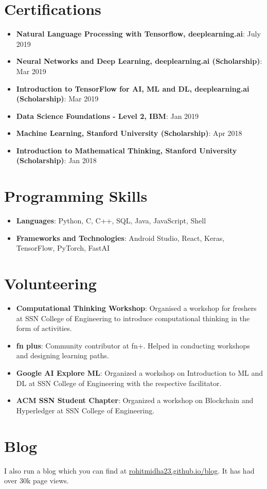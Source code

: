\documentclass[letterpaper,11pt]{article}
\newcommand{\resumeItem}[2]{
  \item\small{
    \textbf{#1}{: #2 \vspace{-2pt}}
  }
}
\newcommand{\resumeSubItem}[2]{\resumeItem{#1}{#2}\vspace{-4pt}}
\newcommand{\resumeSubHeadingListStart}{\begin{itemize}[leftmargin=*]}
\newcommand{\resumeSubHeadingListEnd}{\end{itemize}}
\begin{document}
\section{Certifications}
  \resumeSubHeadingListStart
        \resumeSubItem
  {Natural Language Processing with Tensorflow, deeplearning.ai}{July 2019}
        \resumeSubItem
  {Neural Networks and Deep Learning, deeplearning.ai (Scholarship)}{Mar 2019}
      \resumeSubItem
  {Introduction to TensorFlow for AI, ML and DL, deeplearning.ai (Scholarship)}{Mar 2019}
    \resumeSubItem
      {Data Science Foundations - Level 2, IBM}{Jan 2019}
    \resumeSubItem
  {Machine Learning, Stanford University (Scholarship)}{Apr 2018}
    \resumeSubItem
  {Introduction to Mathematical Thinking, Stanford University (Scholarship)}{Jan 2018} 	
\resumeSubHeadingListEnd

\section{Programming Skills}
  \resumeSubHeadingListStart
   \item{
     \textbf{Languages}{: Python, C, C++, SQL, Java, JavaScript, Shell}
      }
      \item{
       \textbf{Frameworks and Technologies}{: Android Studio, React, Keras, TensorFlow, PyTorch, FastAI}
    }
  \resumeSubHeadingListEnd

\section{Volunteering}
\resumeSubHeadingListStart
\resumeItem{Computational Thinking Workshop}{Organised  a workshop for freshers at SSN College of Engineering to introduce computational thinking in the form of activities.}
\resumeItem{fn plus}{Community contributor at fn+. Helped in conducting workshops and designing learning paths.}
\resumeItem{Google AI Explore ML}{Organized a workshop on Introduction to ML and DL at SSN College of Engineering with the respective facilitator.}
\resumeItem{ACM SSN Student Chapter}{Organized a workshop on Blockchain and Hyperledger at SSN College of Engineering.}
\resumeSubHeadingListEnd
\section{Blog}
I also run a blog which you can find at \href{https://rohitmidha23.github.io/blog}{rohitmidha23.github.io/blog}. It has had over 30k page views.
\end{document}
